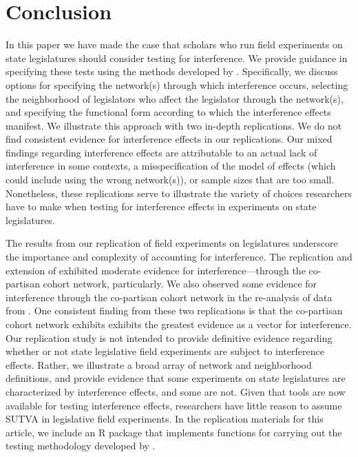 \documentclass[12pt]{article}
\begin{document}
\section{Conclusion}


In this paper we have made the case that scholars who run field experiments on state legislatures should consider testing for interference. We provide guidance in specifying these tests using the methods developed by  \citet{bowers2012reasoning}. Specifically, we discuss options for specifying the network(s) through which interference occurs, selecting the neighborhood of legislators who affect the legislator through the network(s), and specifying the functional form according to which the interference effects manifest. We illustrate this approach with two in-depth replications. We do not find consistent evidence for interference effects in our replications. Our mixed findings regarding interference effects are attributable to an actual lack of interference in some contexts, a misspecification of the model of effects (which could include using the wrong network(s)), or sample sizes that are too small.  Nonetheless, these replications serve to illustrate the variety of choices researchers have to make when testing for interference effects in experiments on state legislatures. 

The results from our replication of field experiments on legislatures underscore the importance and complexity of accounting for interference. The replication and extension of \citet{butler2011can} exhibited moderate evidence for interference---through the co-partisan cohort network, particularly.  We also observed some evidence for interference through the co-partisan cohort network in the re-analysis of data from \citet{bergan2015call}.  One consistent finding from these two replications is that the co-partisan cohort network exhibits exhibits the greatest evidence as a vector for interference. Our replication study is not intended to provide definitive evidence regarding whether or not state legislative field experiments are subject to interference effects. Rather, we illustrate a broad array of network and neighborhood definitions, and provide evidence that some experiments on state legislatures are characterized by interference effects, and some are not. Given that tools are now available for testing interference effects, researchers have little reason to assume SUTVA in legislative field experiments. In the replication materials for this article, we include an R package that implements functions for carrying out the testing methodology developed by \citet{bowers2012reasoning}.
\end{document}
